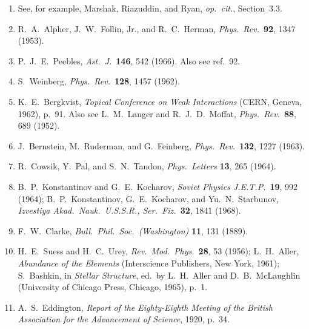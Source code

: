 \begin{enumerate}
  \item{}\label{ch15-ref-91}
  See, for example, Marshak, Riazuddin, and Ryan,
  \emph{op.\ cit.}, Section~3.3.

  \item{}\label{ch15-ref-92}
  R.~A.~Alpher, J.~W.~Follin, Jr., and R.~C.~Herman,
  \emph{Phys.\ Rev.}\ \textbf{92}, 1347 (1953).

  \item{}\label{ch15-ref-93}
  P.~J.~E.~Peebles, \emph{Ast.\ J.}\ \textbf{146}, 542 (1966).
  Also see ref.~92.

  \item{}\label{ch15-ref-94}
  S.~Weinberg, \emph{Phys.\ Rev.}\ \textbf{128}, 1457 (1962).

  \item{}\label{ch15-ref-95}
  K.~E.~Bergkvist, \emph{Topical Conference on Weak Interactions}
  (CERN, Geneva, 1962), p.~91.
  Also see L.~M.~Langer and R.~J.~D.~Moffat,
  \emph{Phys.\ Rev.}\ \textbf{88}, 689 (1952).

  \item{}\label{ch15-ref-96}
  J.~Bernstein, M.~Ruderman, and G.~Feinberg,
  \emph{Phys.\ Rev.}\ \textbf{132}, 1227 (1963).

  \item{}\label{ch15-ref-97}
  R.~Cowsik, Y.~Pal, and S.~N.~Tandon,
  \emph{Phys.\ Letters} \textbf{13}, 265 (1964).

  \item{}\label{ch15-ref-98}
  B.~P.~Konstantinov and G.~E.~Kocharov,
  \emph{Soviet Physics J.E.T.P.}\ \textbf{19}, 992 (1964);
  B.~P.~Konstantinov, G.~E.~Kocharov, and Yu.~N.~Starbunov,
  \emph{Izvestiya Akad.\ Nauk.\ U.S.S.R., Ser.\ Fiz.}\ \textbf{32},
  1841 (1968).

  \item{}\label{ch15-ref-99}
  F.~W.~Clarke, \emph{Bull.\ Phil.\ Soc.\ (Washington)} \textbf{11},
  131 (1889).

  \item{}\label{ch15-ref-100}
  H.~E.~Suess and H.~C.~Urey,
  \emph{Rev.\ Mod.\ Phys.}\ \textbf{28}, 53 (1956);
  L.~H.~Aller, \emph{Abundance of the Elements}
  (Interscience Publishers, New York, 1961);
  S.~Bashkin, in \emph{Stellar Structure},
  ed.\ by L.~H.~Aller and D.~B.~McLaughlin
  (University of Chicago Press, Chicago, 1965), p.~1.

  \item{}\label{ch15-ref-101}
  A.~S.~Eddington,
  \emph{Report of the Eighty-Eighth Meeting of the British Association for
  the Advancement of Science}, 1920, p.~34.


\end{enumerate}
